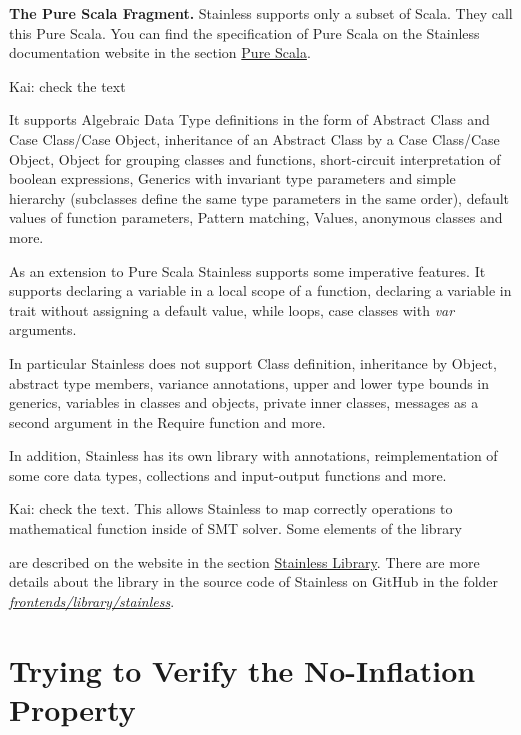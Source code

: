 \documentclass[runningheads]{llncs}
\renewcommand{\paragraph}{\textbf}%
\newcommand{\todo}[1]{{\par \color{red}#1}}
\begin{document}
\paragraph{The Pure Scala Fragment.} Stainless supports only a subset
of Scala. They call this Pure Scala.  You can find the specification of Pure
Scala on the Stainless documentation website
\cite{Stainless:documentation} in the section
\href{https://epfl-lara.github.io/stainless/purescala.html}{Pure
  Scala}.
\todo{Kai: check the text

It supports Algebraic Data Type definitions in the form of 
Abstract Class and Case Class/Case Object,
inheritance of an Abstract Class by a Case Class/Case Object,
Object for grouping classes and functions,  
short-circuit interpretation of boolean expressions, 
Generics with invariant type parameters and simple hierarchy 
(subclasses define the same type parameters in the same order),
default values of function parameters,
Pattern matching, 
Values,
anonymous classes and more.
  
As an extension to Pure Scala Stainless supports some imperative features.
It supports 
declaring a variable in a local scope of a function, 
declaring a variable in trait without assigning a default value,
while loops,
case classes with \textit{var} arguments.
  
In particular Stainless does not support
Class definition,
inheritance by Object,
abstract type members,
variance annotations, upper and lower type bounds in generics,
variables in classes and objects,
private inner classes,
messages as a second argument in the Require function and more.}

In addition, Stainless has its own library with annotations,
reimplementation of some core data types, collections and input-output
functions and more. \todo{Kai: check the text.
This allows Stainless to map correctly operations 
to mathematical function inside of SMT solver.
Some elements of the library} are described on the website in the section
\href{https://epfl-lara.github.io/stainless/library.html}{Stainless
  Library}.  There are more details about the library in the source
code of Stainless on GitHub \cite{Stainless:github} in the folder
\href{https://github.com/epfl-lara/stainless/tree/master/frontends/library/stainless}{\textit{frontends/library/stainless}}.



\section{Trying to Verify the No-Inflation Property}
\end{document}
